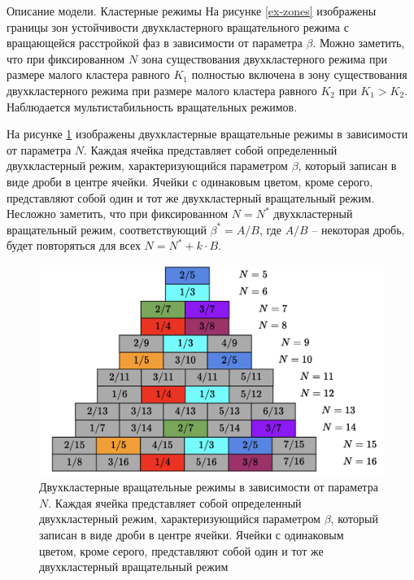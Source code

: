 \begin{chapter}{Описание модели. Кластерные режимы}
	На рисунке \ref{ex-zones} изображены границы зон устойчивости двухкластерного вращательного режима
	с вращающейся расстройкой фаз в зависимости от параметра $\beta$.
	Можно заметить, что при фиксированном $N$ зона существования двухкластерного режима при размере малого кластера равного $K_1$ полностью включена в 
	зону существования двухкластерного режима при размере малого кластера равного $K_2$ при $K_1 > K_2$. Наблюдается мультистабильность вращательных режимов.


	На рисунке \ref{schema} изображены двухкластерные вращательные режимы в зависимости от параметра $N$.
	Каждая ячейка представляет собой определенный двухкластерный режим,
	характеризующийся параметром $\beta$, который записан в виде дроби в центре ячейки. Ячейки с одинаковым цветом, кроме серого, представляют собой
	один и тот же двухкластерный вращательный режим. Несложно заметить, что при фиксированном $N = N^*$
	двухкластерный вращательный режим, соответствующий $\beta^* = A/B$, где $A/B$ -- некоторая дробь,
	будет повторяться для всех $N = N^* + k\cdot B$. 

	\begin{figure}[h!]
		\begin{center}
			\includegraphics[width=1\columnwidth]{pictures/schema.png}
		\end{center}
		\caption{Двухкластерные вращательные режимы в зависимости от параметра $N$. Каждая ячейка представляет собой определенный двухкластерный режим,
		характеризующийся параметром $\beta$, который записан в виде дроби в центре ячейки. Ячейки с одинаковым цветом, кроме серого, представляют собой
		один и тот же двухкластерный вращательный режим}
		\label{schema}
	\end{figure}

\end{chapter}